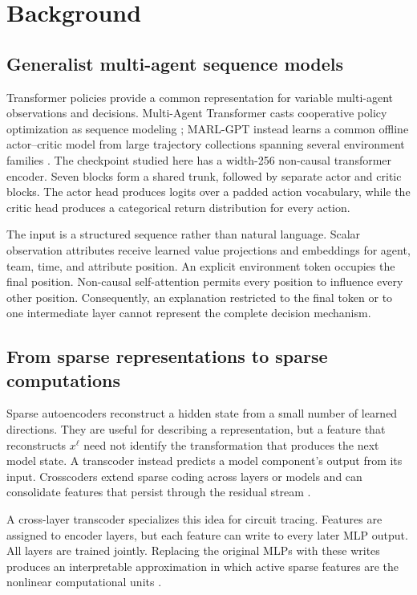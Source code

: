 \section{Background}

\subsection{Generalist multi-agent sequence models}

Transformer policies provide a common representation for variable multi-agent observations and decisions. Multi-Agent Transformer casts cooperative policy optimization as sequence modeling \cite{wen2022mat}; MARL-GPT instead learns a common offline actor--critic model from large trajectory collections spanning several environment families \cite{nesterova2026marlgpt}. The checkpoint studied here has a width-256 non-causal transformer encoder. Seven blocks form a shared trunk, followed by separate actor and critic blocks. The actor head produces logits over a padded action vocabulary, while the critic head produces a categorical return distribution for every action.

The input is a structured sequence rather than natural language. Scalar observation attributes receive learned value projections and embeddings for agent, team, time, and attribute position. An explicit environment token occupies the final position. Non-causal self-attention permits every position to influence every other position. Consequently, an explanation restricted to the final token or to one intermediate layer cannot represent the complete decision mechanism.

\subsection{From sparse representations to sparse computations}

Sparse autoencoders reconstruct a hidden state from a small number of learned directions. They are useful for describing a representation, but a feature that reconstructs $x^\ell$ need not identify the transformation that produces the next model state. A transcoder instead predicts a model component's output from its input. Crosscoders extend sparse coding across layers or models and can consolidate features that persist through the residual stream \cite{lindsey2024crosscoders}.

A cross-layer transcoder specializes this idea for circuit tracing. Features are assigned to encoder layers, but each feature can write to every later MLP output. All layers are trained jointly. Replacing the original MLPs with these writes produces an interpretable approximation in which active sparse features are the nonlinear computational units \cite{ameisen2025circuittracing}.

